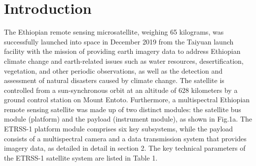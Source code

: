 \documentclass[final,5p,times,twocolumn]{elsarticle}
\begin{document}
\section{Introduction}
\label{}
The Ethiopian remote sensing microsatellite, weighing 65 kilograms, was successfully launched into space in December 2019 from the Taiyuan launch facility with the mission of providing earth imagery data to address Ethiopian climate change and earth-related issues such as water resources, desertification, vegetation, and other periodic observations, as well as the detection and assessment of natural disasters caused by climate change.  The satellite is controlled from a sun-synchronous orbit at an altitude of 628 kilometers by a ground control station on Mount Entoto. Furthermore, a multispectral Ethiopian remote sensing satellite was made up of two distinct modules: the satellite bus module (platform) and the payload (instrument module), as shown in Fig.1a. The ETRSS-1 platform module comprises six key subsystems, while the payload consists of a multispectral camera and a data transmission system that provides imagery data, as detailed in detail in section 2. The key technical parameters of the ETRSS-1 satellite system are listed in Table 1. \\
\end{document}
